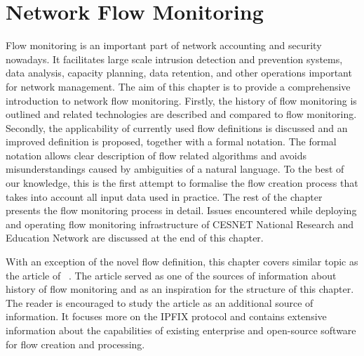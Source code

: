 \chapter{Network Flow Monitoring}\label{chap:network-flow-monitoring}

\begin{chapintro}

Flow monitoring is an important part of network accounting and security nowadays. It facilitates large scale intrusion detection and prevention systems, data analysis, capacity planning, data retention, and other operations important for network management. The aim of this chapter is to provide a comprehensive introduction to network flow monitoring. Firstly, the history of flow monitoring is outlined and related technologies are described and compared to flow monitoring. Secondly, the applicability of currently used flow definitions is discussed and an improved definition is proposed, together with a formal notation. The formal notation allows clear description of flow related algorithms and avoids misunderstandings caused by ambiguities of a natural language. To the best of our knowledge, this is the first attempt to formalise the flow creation process that takes into account all input data used in practice. The rest of the chapter presents the flow monitoring process in detail. Issues encountered while deploying and operating flow monitoring infrastructure of CESNET National Research and Education Network are discussed at the end of this chapter. 

With an exception of the novel flow definition, this chapter covers similar topic as the article of \citeauthor{Hofstede-2014-Flow}~\cite{Hofstede-2014-Flow}. The article served as one of the sources of information about history of flow monitoring and as an inspiration for the structure of this chapter. The reader is encouraged to study the article as an additional source of information. It focuses more on the IPFIX protocol and contains extensive information about the capabilities of existing enterprise and open-source software for flow creation and processing. 



\end{chapintro}

